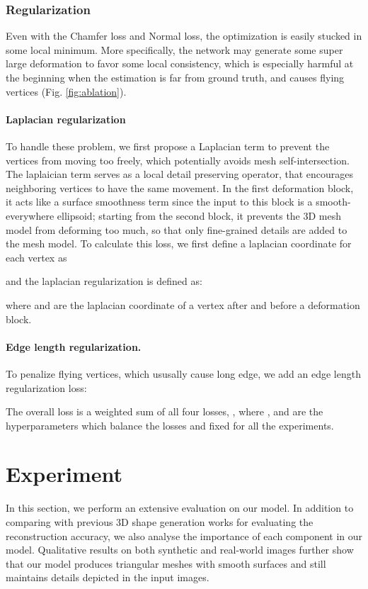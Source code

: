 \documentclass[runningheads]{llncs}
\newcommand{\figref}[1]{Fig. \ref{#1}}
\begin{document}
\subsubsection{Regularization}
Even with the Chamfer loss and Normal loss, the optimization is easily stucked in some local minimum. More specifically, the network may generate some super large deformation to favor some local consistency, which is especially harmful at the beginning when the estimation is far from ground truth, and causes flying vertices (\figref{fig:ablation}).

\paragraph{Laplacian regularization} To handle these problem, we first propose a Laplacian term to prevent the vertices from moving too freely, which potentially avoids mesh self-intersection. The laplaician term serves as a local detail preserving operator, that encourages neighboring vertices to have the same movement. 
In the first deformation block, it acts like a surface smoothness term since the input to this block is a smooth-everywhere ellipsoid; starting from the second block, it prevents the 3D mesh model from deforming too much, so that only fine-grained details are added to the mesh model.
To calculate this loss, we first define a laplacian coordinate for each vertex  as

and the laplacian regularization is defined as:

where  and  are the laplacian coordinate of a vertex after and before a deformation block.

\paragraph{Edge length regularization.} To penalize flying vertices, which ususally cause long edge, we add an edge length regularization loss:



The overall loss is a weighted sum of all four losses, , where ,  and  are the hyperparameters which balance the losses and fixed for all the experiments. 
\section{Experiment}
\label{sec:exp}

In this section, we perform an extensive evaluation on our model. In addition to comparing with previous 3D shape generation works for evaluating the reconstruction accuracy, we also analyse the importance of each component in our model. Qualitative results on both synthetic and real-world images further show that our model produces triangular meshes with smooth surfaces and still maintains details depicted in the input images.
\end{document}
